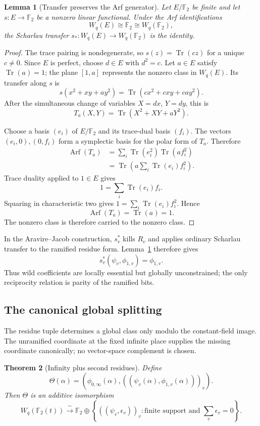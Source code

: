 \documentclass[11pt]{article}
\newtheorem{theorem}{Theorem}[section]
\newtheorem{lemma}[theorem]{Lemma}
\theoremstyle{definition}
\theoremstyle{remark}
\newcommand{\F}{\mathbb{F}}
\newcommand{\Tr}{\operatorname{Tr}}
\newcommand{\Arf}{\operatorname{Arf}}
\begin{document}
\begin{lemma}[Transfer preserves the Arf generator]\label{lem:transfer}
Let $E/\F_2$ be finite and let $s:E\to\F_2$ be a nonzero linear functional.
Under the Arf identifications
\[
W_q(E)\cong\F_2\cong W_q(\F_2),
\]
the Scharlau transfer $s_*:W_q(E)\to W_q(\F_2)$ is the identity.
\end{lemma}

\begin{proof}
The trace pairing is nondegenerate, so $s(z)=\Tr(cz)$ for a unique
$c\ne0$.  Since $E$ is perfect, choose $d\in E$ with $d^2=c$.  Let
$a\in E$ satisfy $\Tr(a)=1$; the plane $[1,a]$ represents the nonzero class
in $W_q(E)$.  Its transfer along $s$ is
\[
s(x^2+xy+ay^2)=\Tr(cx^2+cxy+cay^2).
\]
After the simultaneous change of variables $X=dx$, $Y=dy$, this is
\[
T_a(X,Y)=\Tr(X^2+XY+aY^2).
\]

Choose a basis $(e_i)$ of $E/\F_2$ and its trace-dual basis $(f_i)$.
The vectors $(e_i,0),(0,f_i)$ form a symplectic basis for the polar form of
$T_a$.  Therefore
\begin{align*}
\Arf(T_a)
 &=\sum_i\Tr(e_i^2)\Tr(af_i^2)\\
 &=\Tr\!\left(a\sum_i\Tr(e_i)f_i^2\right).
\end{align*}
Trace duality applied to $1\in E$ gives
\[
1=\sum_i\Tr(e_i)f_i.
\]
Squaring in characteristic two gives
$1=\sum_i\Tr(e_i)f_i^2$.  Hence
\[
\Arf(T_a)=\Tr(a)=1.
\]
The nonzero class is therefore carried to the nonzero class.
\end{proof}

In the Aravire--Jacob construction, $s_v^*$ kills $R_v$ and applies ordinary
Scharlau transfer to the ramified residue form.  Lemma~\ref{lem:transfer}
therefore gives
\[
s_v^*(\psi_v,\phi_{1,v})=\phi_{1,v}.
\]
Thus wild coefficients are locally essential but globally unconstrained; the
only reciprocity relation is parity of the ramified bits.

\subsection{The canonical global splitting}

The residue tuple determines a global class only modulo the constant-field
image.  The unramified coordinate at the fixed infinite place supplies the
missing coordinate canonically; no vector-space complement is chosen.

\begin{theorem}[Infinity plus second residues]\label{thm:coordinates}
Define
\[
\Theta(\alpha)=
\left(\phi_{0,\infty}(\alpha),
  ((\psi_v(\alpha),\phi_{1,v}(\alpha)))_v\right).
\]
Then $\Theta$ is an additive isomorphism
\[
W_q(\F_2(t))\xrightarrow{\ \sim\ }
\F_2\oplus
\left\{((\psi_v,\epsilon_v))_v:
  \text{finite support and }\sum_v\epsilon_v=0\right\}.
\]
\end{theorem}
\end{document}
